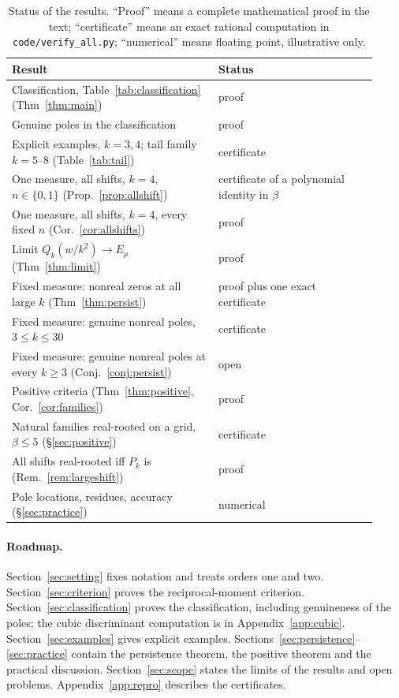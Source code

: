 \documentclass[11pt,a4paper]{article}
\theoremstyle{definition}
\theoremstyle{remark}
\begin{document}
\begin{table}[htbp]
\centering
\caption{Status of the results. ``Proof'' means a complete mathematical
proof in the text; ``certificate'' means an exact rational computation in
\texttt{code/verify\_all.py}; ``numerical'' means floating point,
illustrative only.}
\label{tab:status}
\small
\begin{tabular}{@{}p{0.52\linewidth}p{0.40\linewidth}@{}}
\toprule
Result & Status\\
\midrule
Classification, Table~\ref{tab:classification} (Thm~\ref{thm:main}) & proof\\
Genuine poles in the classification & proof\\
Explicit examples, $k=3,4$; tail family $k=5$--$8$ (Table~\ref{tab:tail}) & certificate\\
One measure, all shifts, $k=4$, $n\in\{0,1\}$ (Prop.~\ref{prop:allshift}) & certificate of a polynomial identity in $\beta$\\
One measure, all shifts, $k=4$, every fixed $n$ (Cor.~\ref{cor:allshifts}) & proof\\
Limit $Q_k(w/k^2)\to E_\mu$ (Thm~\ref{thm:limit}) & proof\\
Fixed measure: nonreal zeros at all large $k$ (Thm~\ref{thm:persist}) & proof plus one exact certificate\\
Fixed measure: genuine nonreal poles, $3\le k\le30$ & certificate\\
Fixed measure: genuine nonreal poles at every $k\ge3$ (Conj.~\ref{conj:persist}) & open\\
Positive criteria (Thm~\ref{thm:positive}, Cor.~\ref{cor:families}) & proof\\
Natural families real-rooted on a grid, $\beta\le5$ (\S\ref{sec:positive}) & certificate\\
All shifts real-rooted iff $P_k$ is (Rem.~\ref{rem:largeshift}) & proof\\
Pole locations, residues, accuracy (\S\ref{sec:practice}) & numerical\\
\bottomrule
\end{tabular}
\end{table}

\paragraph{Roadmap.}
Section~\ref{sec:setting} fixes notation and treats orders one and two.
Section~\ref{sec:criterion} proves the reciprocal-moment criterion.
Section~\ref{sec:classification} proves the classification, including
genuineness of the poles; the cubic discriminant computation is in
Appendix~\ref{app:cubic}. Section~\ref{sec:examples} gives explicit
examples. Sections~\ref{sec:persistence}--\ref{sec:practice} contain the
persistence theorem, the positive theorem and the practical discussion.
Section~\ref{sec:scope} states the limits of the results and open
problems. Appendix~\ref{app:repro} describes the certificates.
\end{document}
